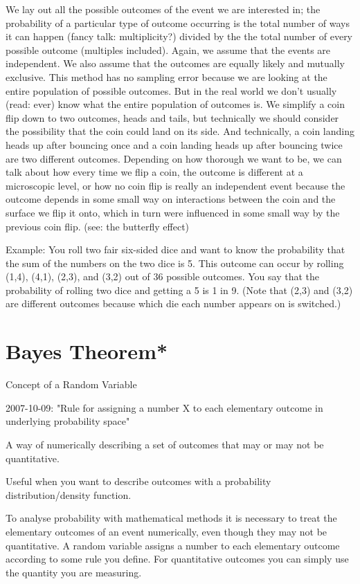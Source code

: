 \documentclass{article}
\begin{document}
We lay out all the possible outcomes of the event we are interested in; the probability of a particular type of outcome occurring is the total number of ways it can happen (fancy talk: multiplicity?) divided by the the total number of every possible outcome (multiples included).  Again, we assume that the events are independent. We also assume that the outcomes are equally likely and mutually exclusive. This method has no sampling error because we are looking at the entire population of possible outcomes.  But in the real world we don't usually (read: ever) know what the entire population of outcomes is.  We simplify a coin flip down to two outcomes, heads and tails, but technically we should consider the possibility that the coin could land on its side.  And technically, a coin landing heads up after bouncing once and a coin landing heads up after bouncing twice are two different outcomes.  Depending on how thorough we want to be, we can talk about how every time we flip a coin, the outcome is different at a microscopic level, or how no coin flip is really an independent event because the outcome depends in some small way on interactions between the coin and the surface we flip it onto, which in turn were influenced in some small way by the previous coin flip. (see:  the butterfly effect)


Example:  You roll two fair six-sided dice and want to know the probability that the sum of the numbers on the two dice is 5.  This outcome can occur by rolling (1,4), (4,1), (2,3), and (3,2) out of 36 possible outcomes.  You say that the probability of rolling two dice and getting a 5 is 1 in 9.  (Note that (2,3) and (3,2) are different outcomes because which die each number appears on is switched.)


\section{Bayes Theorem*}


Concept of a Random Variable

2007-10-09: "Rule for assigning a number X to each elementary outcome in underlying probability space"

A way of numerically describing a set of outcomes that may or may not be quantitative.

Useful when you want to describe outcomes with a probability distribution/density function.


To analyse probability with mathematical methods it is necessary to treat the elementary outcomes of an event numerically, even though they may not be quantitative.  A random variable assigns a number to each elementary outcome according to some rule you define.  For quantitative outcomes you can simply use the quantity you are measuring.
\end{document}
